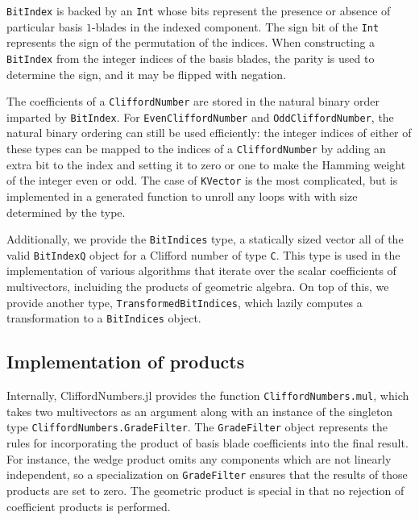 \documentclass{juliacon}
\begin{document}
\texttt{BitIndex} is backed by an \texttt{Int} whose bits represent the presence or absence of particular basis $1$-blades in the indexed component.
The sign bit of the \texttt{Int} represents the sign of the permutation of the indices.
When constructing a \texttt{BitIndex} from the integer indices of the basis blades, the parity is used to determine the sign, and it may be flipped with negation.

The coefficients of a \texttt{CliffordNumber} are stored in the natural binary order imparted by \texttt{BitIndex}.
For \texttt{EvenCliffordNumber} and \texttt{OddCliffordNumber}, the natural binary ordering can still be used efficiently:
the integer indices of either of these types can be mapped to the indices of a \texttt{CliffordNumber} by adding an extra bit to the index and setting it to zero or one to make the Hamming weight of the integer even or odd.
The case of \texttt{KVector} is the most complicated, but is implemented in a generated function to unroll any loops with with size determined by the type.

Additionally, we provide the \texttt{BitIndices} type, a statically sized vector all of the valid \texttt{BitIndex{Q}} object for a Clifford number of type \texttt{C}.
This type is used in the implementation of various algorithms that iterate over the scalar coefficients of multivectors, incluiding the products of geometric algebra.
On top of this, we provide another type, \texttt{TransformedBitIndices}, which lazily computes a transformation to a \texttt{BitIndices} object.

\subsection{Implementation of products}

Internally, CliffordNumbers.jl provides the function \texttt{CliffordNumbers.mul}, which takes two multivectors as an argument along with an instance of the singleton type \texttt{CliffordNumbers.GradeFilter}.
The \texttt{GradeFilter} object represents the rules for incorporating the product of basis blade coefficients into the final result.
For instance, the wedge product omits any components which are not linearly independent, so a specialization on \texttt{GradeFilter\string{:$\mathtt{\wedge}$ \string}} ensures that the results of those products are set to zero.
The geometric product is special in that no rejection of coefficient products is performed.
\end{document}
